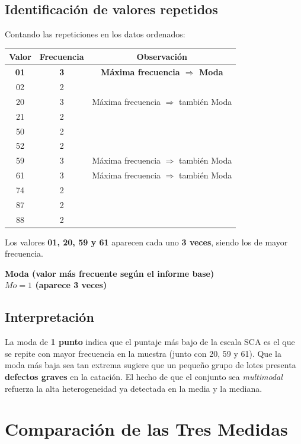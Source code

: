 \documentclass[12pt,a4paper]{article}
\newcommand{\cajaresultado}[2]{%
  \begin{center}
    \colorbox{cremoso}{%
      \parbox{0.85\textwidth}{%
        \vspace{4pt}
        \centering
        \textbf{\textcolor{cafeoscuro}{#1}} \\[4pt]
        \Large\textcolor{cafemedio}{\textbf{#2}}
        \vspace{4pt}
      }
    }
  \end{center}
}
\begin{document}
\subsection{Identificación de valores repetidos}

Contando las repeticiones en los datos ordenados:

\begin{center}
\begin{tabular}{ccc}
\toprule
\textbf{Valor} & \textbf{Frecuencia} & \textbf{Observación} \\
\midrule
\rowcolor{cafesuave}
\textbf{01} & \textbf{3} & \textbf{Máxima frecuencia $\Rightarrow$ Moda} \\
02 & 2 & \\
20 & 3 & Máxima frecuencia $\Rightarrow$ también Moda \\
21 & 2 & \\
50 & 2 & \\
52 & 2 & \\
59 & 3 & Máxima frecuencia $\Rightarrow$ también Moda \\
61 & 3 & Máxima frecuencia $\Rightarrow$ también Moda \\
74 & 2 & \\
87 & 2 & \\
88 & 2 & \\
\bottomrule
\end{tabular}
\end{center}

Los valores \textbf{01, 20, 59 y 61} aparecen cada uno \textbf{3 veces}, siendo los de mayor frecuencia.

\cajaresultado{Moda (valor más frecuente según el informe base)}{\(Mo = 1\) (aparece 3 veces)}

\subsection{Interpretación}

La moda de \textbf{1 punto} indica que el puntaje más bajo de la escala SCA es el que se repite con mayor frecuencia en la muestra (junto con 20, 59 y 61). Que la moda más baja sea tan extrema sugiere que un pequeño grupo de lotes presenta \textbf{defectos graves} en la catación. El hecho de que el conjunto sea \textit{multimodal} refuerza la alta heterogeneidad ya detectada en la media y la mediana.

\section{Comparación de las Tres Medidas}
\end{document}
